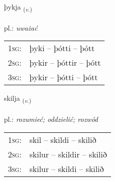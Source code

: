 \documentclass[frontgrid, backgrid]{flacards}\usepackage[]{graphicx}\usepackage[]{xcolor}
\begin{document}
\renewcommand{\flhead}{\vskip5pt \fboxsep=0pt {\small\bfseries\footnotesize Sagnorð | czasownik}}
\renewcommand{\fcfoot}{\vskip5pt \fboxsep=0pt \hspace{2pt}{\small\bfseries\footnotesize 1K}}

\renewcommand{\blhead}{\vskip5pt {\small\bfseries\footnotesize Sagnorð | czasownik }}
\renewcommand{\bcfoot}{\vskip5pt \hspace{2pt}{\small\bfseries\footnotesize 1K}}


{þykja \small{\textsubscript{(\textit{v.})}} \\[1ex] %
\textphonetic{[θɪːca]} \\
pl.: \emph{uważać} \\  [2ex]
\renewcommand*{\arraystretch}{0.8}
\begin{tabular}{p{1cm}l}
\textsc{1sg}: & þyki -- þótti -- þótt \\ 
\textsc{2sg}: & þykir -- þóttir -- þótt \\ 
\textsc{3sg}: & þykir -- þótti -- þótt \\ 
\end{tabular}
}

\renewcommand{\flhead}{\vskip5pt \fboxsep=0pt {\small\bfseries\footnotesize Sagnorð | czasownik}}
\renewcommand{\fcfoot}{\vskip5pt \fboxsep=0pt \hspace{2pt}{\small\bfseries\footnotesize 1K}}

\renewcommand{\blhead}{\vskip5pt {\small\bfseries\footnotesize Sagnorð | czasownik }}
\renewcommand{\bcfoot}{\vskip5pt \hspace{2pt}{\small\bfseries\footnotesize 1K}}


{skilja \small{\textsubscript{(\textit{v.})}} \\[1ex] %
\textphonetic{[scɪlja]} \\
pl.: \emph{rozumieć; oddzielić; rozwód} \\  [2ex]
\renewcommand*{\arraystretch}{0.8}
\begin{tabular}{p{1cm}l}
\textsc{1sg}: & skil -- skildi -- skilið \\ 
\textsc{2sg}: & skilur -- skildir -- skilið \\ 
\textsc{3sg}: & skilur -- skildi -- skilið \\ 
\end{tabular}
}
\end{document}
